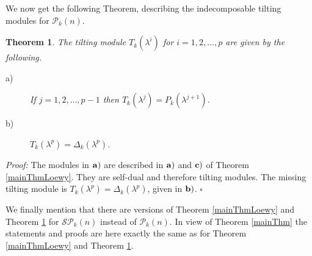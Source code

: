 \documentclass[10pt,hidelinks]{article}
\newcommand{\ParAlg}{{\mathcal P }_{k}}
\newcommand{\SpheAlg}{{\mathcal{SP} }_{k}}
\newtheorem{theorem}{Theorem}
\newenvironment{dem}{\noindent \textit{Proof:} }{\quad \hfill $\square$}
\numberwithin{equation}{section}
\begin{document}
\medskip
We now get the following Theorem, describing the indecomposable tilting modules for $ \ParAlg(n)$.


\begin{theorem}\label{maintilting} The tilting module $ T_k(\lambda^i) $ for $ i=1,2,\ldots, p$ are given by the following.
\label{mainThmLoewyTilting}
\begin{description}
\item[a)] If $ j = 1, 2, \ldots, p-1$ then $  T_k(\lambda^{j}) = P_k(\lambda^{j+1}) $.
\item[b)]  $  T_k(\lambda^p) = \Delta_k(\lambda^p) $.
\end{description}
  \end{theorem}
\begin{dem}
  The modules in $   { \bf a)}$ are described in
  $   { \bf a)}$ and $   { \bf c)}$ of Theorem \ref{mainThmLoewy}. They are self-dual
  and therefore tilting modules. The missing tilting module is $  T_k(\lambda^p) = \Delta_k(\lambda^p) $,
  given in $   { \bf b)}$.
\end{dem}

\medskip
We finally mention that 
there are versions of Theorem \ref{mainThmLoewy} and Theorem \ref{maintilting} 
for $ \SpheAlg(n) $ instead of $ \ParAlg(n) $.  In view of Theorem \ref{mainThm}
the statements and proofs are here 
exactly the same as for Theorem \ref{mainThmLoewy} and Theorem \ref{maintilting}. 
\end{document}
